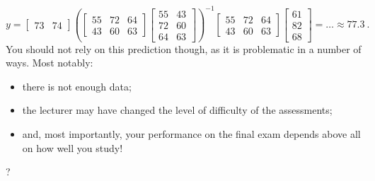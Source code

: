 \begin{exercise}
\begin{enumerate}[(i)]
{		\[ y = \begin{bmatrix} 73 & 74 \end{bmatrix}
		\left( \begin{bmatrix} 55 & 72 & 64 \\ 43 & 60 & 63 \end{bmatrix}
		\begin{bmatrix} 55 & 43 \\ 72 & 60 \\ 64 & 63 \end{bmatrix} \right)^{-1}
		\begin{bmatrix} 55 & 72 & 64 \\ 43 & 60 & 63 \end{bmatrix}
		\begin{bmatrix} 61 \\ 82 \\ 68 \end{bmatrix} = \dots \approx 77.3 \:.  \]
		You should not rely on this prediction though, as it is problematic in a number of ways. Most notably:
		\begin{itemize}
			\item there is not enough data;
			\item the lecturer may have changed the level of difficulty of the assessments;
			\item and, most importantly, your performance on the final exam depends above all on how well you study!
	\end{itemize}}?
\end{enumerate}
\end{exercise}